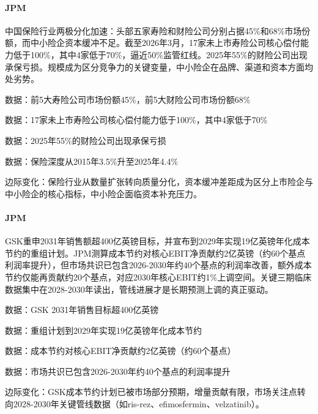\documentclass[11pt]{ctexart}
\begin{document}
\paragraph{JPM} 中国保险行业两极分化加速：头部五家寿险和财险公司分别占据45\%和68\%市场份额，而中小险企资本缓冲不足。截至2026年3月，17家未上市寿险公司核心偿付能力低于100\%，其中4家低于70\%，逼近50\%监管红线。2025年55\%的财险公司出现承保亏损。规模成为区分竞争力的关键变量，中小险企在品牌、渠道和资本方面均处劣势。
{\small\color{refgray}数据：前5大寿险公司市场份额45\%，前5大财险公司市场份额68\%\par}
{\small\color{refgray}数据：17家未上市寿险公司核心偿付能力低于100\%，其中4家低于70\%\par}
{\small\color{refgray}数据：2025年55\%的财险公司出现承保亏损\par}
{\small\color{refgray}数据：保险深度从2015年3.5\%升至2025年4.4\%\par}
{\small\color{refgray}边际变化：保险行业从数量扩张转向质量分化，资本缓冲差距成为区分上市险企与中小险企的核心指标，中小险企面临资本补充压力。\par}
\paragraph{JPM} GSK重申2031年销售额超400亿英镑目标，并宣布到2029年实现19亿英镑年化成本节约的重组计划。JPM测算成本节约对核心EBIT净贡献约2亿英镑（约60个基点利润率提升），但市场共识已包含2026-2030年约40个基点的利润率改善，额外成本节约仅能再贡献约20个基点，对应2030年核心EBIT约1\%上调空间。关键三期临床数据集中在2028-2030年读出，管线进展才是长期预测上调的真正驱动。
{\small\color{refgray}数据：GSK 2031年销售目标超400亿英镑\par}
{\small\color{refgray}数据：重组计划到2029年实现19亿英镑年化成本节约\par}
{\small\color{refgray}数据：成本节约对核心EBIT净贡献约2亿英镑（约60个基点）\par}
{\small\color{refgray}数据：市场共识已包含2026-2030年约40个基点的利润率提升\par}
{\small\color{refgray}边际变化：GSK成本节约计划已被市场部分预期，增量贡献有限，市场关注点转向2028-2030年关键管线数据（如ris-rez、efimosfermin、velzatinib）。\par}
\end{document}
